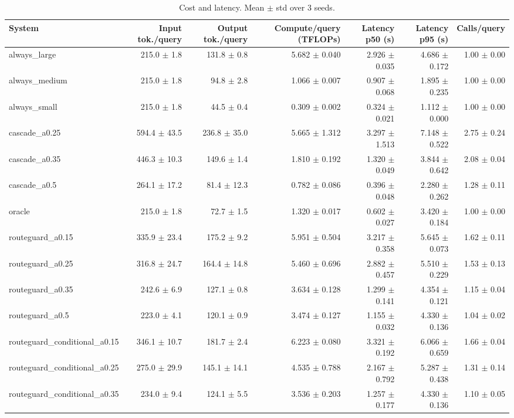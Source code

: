 \begin{table}[t]
\centering
\small
\caption{Cost and latency. Mean $\pm$ std over 3 seeds.}
\label{tab:efficiency}
\begin{tabular}{lrrrrrr}
\toprule
System & Input tok./query & Output tok./query & Compute/query (TFLOPs) & Latency p50 (s) & Latency p95 (s) & Calls/query \\
\midrule
always\_large & 215.0 $\pm$ 1.8 & 131.8 $\pm$ 0.8 & 5.682 $\pm$ 0.040 & 2.926 $\pm$ 0.035 & 4.686 $\pm$ 0.172 & 1.00 $\pm$ 0.00 \\
always\_medium & 215.0 $\pm$ 1.8 & 94.8 $\pm$ 2.8 & 1.066 $\pm$ 0.007 & 0.907 $\pm$ 0.068 & 1.895 $\pm$ 0.235 & 1.00 $\pm$ 0.00 \\
always\_small & 215.0 $\pm$ 1.8 & 44.5 $\pm$ 0.4 & 0.309 $\pm$ 0.002 & 0.324 $\pm$ 0.021 & 1.112 $\pm$ 0.000 & 1.00 $\pm$ 0.00 \\
cascade\_a0.25 & 594.4 $\pm$ 43.5 & 236.8 $\pm$ 35.0 & 5.665 $\pm$ 1.312 & 3.297 $\pm$ 1.513 & 7.148 $\pm$ 0.522 & 2.75 $\pm$ 0.24 \\
cascade\_a0.35 & 446.3 $\pm$ 10.3 & 149.6 $\pm$ 1.4 & 1.810 $\pm$ 0.192 & 1.320 $\pm$ 0.049 & 3.844 $\pm$ 0.642 & 2.08 $\pm$ 0.04 \\
cascade\_a0.5 & 264.1 $\pm$ 17.2 & 81.4 $\pm$ 12.3 & 0.782 $\pm$ 0.086 & 0.396 $\pm$ 0.048 & 2.280 $\pm$ 0.262 & 1.28 $\pm$ 0.11 \\
oracle & 215.0 $\pm$ 1.8 & 72.7 $\pm$ 1.5 & 1.320 $\pm$ 0.017 & 0.602 $\pm$ 0.027 & 3.420 $\pm$ 0.184 & 1.00 $\pm$ 0.00 \\
routeguard\_a0.15 & 335.9 $\pm$ 23.4 & 175.2 $\pm$ 9.2 & 5.951 $\pm$ 0.504 & 3.217 $\pm$ 0.358 & 5.645 $\pm$ 0.073 & 1.62 $\pm$ 0.11 \\
routeguard\_a0.25 & 316.8 $\pm$ 24.7 & 164.4 $\pm$ 14.8 & 5.460 $\pm$ 0.696 & 2.882 $\pm$ 0.457 & 5.510 $\pm$ 0.229 & 1.53 $\pm$ 0.13 \\
routeguard\_a0.35 & 242.6 $\pm$ 6.9 & 127.1 $\pm$ 0.8 & 3.634 $\pm$ 0.128 & 1.299 $\pm$ 0.141 & 4.354 $\pm$ 0.121 & 1.15 $\pm$ 0.04 \\
routeguard\_a0.5 & 223.0 $\pm$ 4.1 & 120.1 $\pm$ 0.9 & 3.474 $\pm$ 0.127 & 1.155 $\pm$ 0.032 & 4.330 $\pm$ 0.136 & 1.04 $\pm$ 0.02 \\
routeguard\_conditional\_a0.15 & 346.1 $\pm$ 10.7 & 181.7 $\pm$ 2.4 & 6.223 $\pm$ 0.080 & 3.321 $\pm$ 0.192 & 6.066 $\pm$ 0.659 & 1.66 $\pm$ 0.04 \\
routeguard\_conditional\_a0.25 & 275.0 $\pm$ 29.9 & 145.1 $\pm$ 14.1 & 4.535 $\pm$ 0.788 & 2.167 $\pm$ 0.792 & 5.287 $\pm$ 0.438 & 1.31 $\pm$ 0.14 \\
routeguard\_conditional\_a0.35 & 234.0 $\pm$ 9.4 & 124.1 $\pm$ 5.5 & 3.536 $\pm$ 0.203 & 1.257 $\pm$ 0.177 & 4.330 $\pm$ 0.136 & 1.10 $\pm$ 0.05 \\
\bottomrule
\end{tabular}
\end{table}
